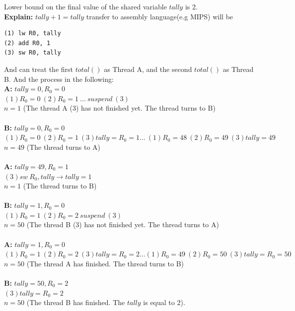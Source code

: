 \documentclass[12pt]{article}
\newenvironment{sol}[1][Solution]{\begin{trivlist}\item[\hskip\labelsep {\bfseries #1:}]}{\end{trivlist}}
\begin{document}
\begin{enumerate}
\begin{sol}
Lower bound on the final value of the shared variable $tally$ is 2.\\
\textbf{Explain: } $tally + 1 = tally$ transfer to assembly language(e.g MIPS) will be 
\begin{verbatim}
(1) lw R0, tally
(2) add R0, 1
(3) sw R0, tally 
\end{verbatim}
And can treat the first $total()$ as Thread A, and the second $total()$ as Thread B. And the process in the following:\\
\textbf{A:} $tally = 0, R_0 = 0 $ \\ 
$ (1) R_0 = 0 \ (2) R_0 = 1 \ ... \ suspend \ (3) \ $ \\ 
$n = 1$  (The thread A (3) has not finished yet. The thread turns to B)\\
\\
\textbf{B:} $tally = 0, R_0=0$ \\
$ (1) R_0 = 0 \ (2) R_0 = 1 \ (3) tally = R_0 = 1 \dots \ (1) R_0 = 48 \ (2) R_0 = 49 \ (3) tally = 49$ \\ 
$n = 49$  (The thread turns to A)\\
\\
\textbf{A:} $tally = 49, R_0 = 1$\\
$ (3) sw \ R_0, tally \rightarrow tally = 1$\\
$n = 1$ (The thread turns to B)\\
\\
\textbf{B:} $tally = 1, R_0 = 0$\\
$(1) R_0 = 1 \ (2) R_0 = 2 \ suspend\ (3) $\\
$n = 50$ (The thread B (3) has not finished yet. The thread turns to A)\\
\\
\textbf{A:} $tally = 1, R_0 = 0$\\
$(1) R_0 = 1 \ (2) R_0 = 2 \ (3) tally = R_0 = 2 \dots (1)R_0 = 49\ (2) R_0 = 50 \ (3)tally = R_0 = 50$\\
$n = 50$ (The thread A has finished. The thread turns to B)\\
\\
\textbf{B:} $tally = 50, R_0 = 2$\\
$(3) tally = R_0 = 2$\\
$n = 50$ (The thread B has finished. The $tally$ is equal to $2$).


\end{sol}
\end{enumerate}
\end{document}
